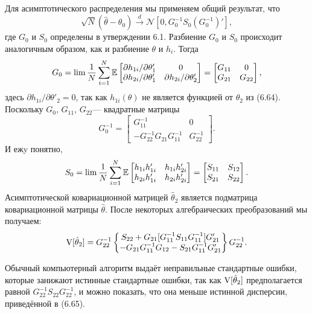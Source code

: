 Для асимптотического распределения мы применяем общий результат, что 
\[
\sqrt{N} (\hat{\theta}-\theta_0) \xrightarrow{d} \mathcal{N}[0,G^{-1}_0 S_0 (G^{-1}_0)'],
\] 
где $G_0$ и $S_0$ определены в утверждении 6.1. Разбиение $G_0$ и $S_0$ происходит аналогичным образом, как и разбиение $\theta$ и $h_i$. Тогда
\[
G_0= \lim \frac{1}{N} \sum_{i=1}^{N} \mathbb{E} \begin{bmatrix} \partial h_{1i} / \partial \theta'_1 & 0 \\ \partial h_{2i} / \partial \theta'_1 & \partial h_{2i} / \partial \theta'_2
\end{bmatrix} = \begin{bmatrix} G_{11} & 0 \\  G_{21} &  G_{22} \end{bmatrix},
\]
здесь $\partial h_{1i} / \partial \theta'_2 =0$, так как $h_{1i}(\theta)$ не является функцией от $\theta_2$ из (6.64). Поскольку $G_0$, $G_{11}$, $G_{22}$--- квадратные матрицы
\[
G^{-1}_0 = \begin{bmatrix} G^{-1}_{11} & 0 \\  -G^{-1}_{22} G_{21} G^{-1}_{11} &  G^{-1}_{22} \end{bmatrix}.
\]
И ежy понятно,
\[
S_0= \lim \frac{1}{N} \sum_{i=1}^{N} \mathbb{E} \begin{bmatrix} h_{1i} h_{1i}' &  h_{1i} h_{2i}' \\ h_{2i} h_{1i}' &  h_{2i} h_{2i}' \end{bmatrix}= \begin{bmatrix} S_{11} & S_{12} \\ S_{21} & S_{22} \end{bmatrix}.
\]
Асимптотической ковариационной матрицей $\hat{\theta}_2$ является подматрица  ковариационной матрицы $\hat{\theta}$. После некоторых алгебраических преобразований мы получаем:
\begin{equation}
\mathrm{V}[\hat{\theta}_2]= G^{-1}_{22} \left\{ \begin{matrix} S_{22} + G_{21} [G^{-1}_{11} S_{11} G^{-1}_{11}] G'_{21} \\ -G_{21} G^{-1}_{11} G_{12} - S_{21} G^{-1}_{11} G'_{21} \end{matrix} \right\} G^{-1}_{22}.
\end{equation}

Обычный компьютерный алгоритм выдаёт неправильные стандартные ошибки, которые  занижают истинные стандартные ошибки, так как $\mathrm{V}[\hat{\theta}_2]$  предполагается равной $G^{-1}_{22} S_{22} G^{-1}_{22}$, и можно показать, что она меньше истинной дисперсии, приведённой в (6.65).


